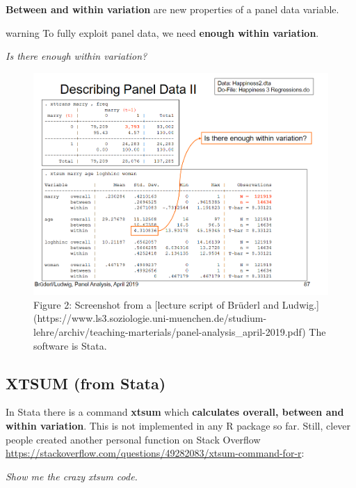 \documentclass[
]{book}
\begin{document}
\textbf{Between and within variation} are new properties of a panel data variable.

\begin{infobox2}warning
To fully exploit panel data, we need \textbf{enough within variation}.

\end{infobox2}

\emph{Is there enough within variation?}

\begin{figure}

{\centering \includegraphics[width=0.8\linewidth]{images/Within_Variation} 

}

\caption{\label{fig:within}Figure 2: Screenshot from a [lecture script of Brüderl and Ludwig.](https://www.ls3.soziologie.uni-muenchen.de/studium-lehre/archiv/teaching-marterials/panel-analysis_april-2019.pdf) The software is Stata.}\label{fig:unnamed-chunk-58}
\end{figure}

\hypertarget{xtsum-from-stata}{%
\subsection{XTSUM (from Stata)}\label{xtsum-from-stata}}

In Stata there is a command \textbf{xtsum} which \textbf{calculates overall, between and within variation}. This is not implemented in any R package so far. Still, clever people created another personal function on Stack Overflow \url{https://stackoverflow.com/questions/49282083/xtsum-command-for-r}:

\emph{Show me the crazy xtsum code.}
\end{document}
